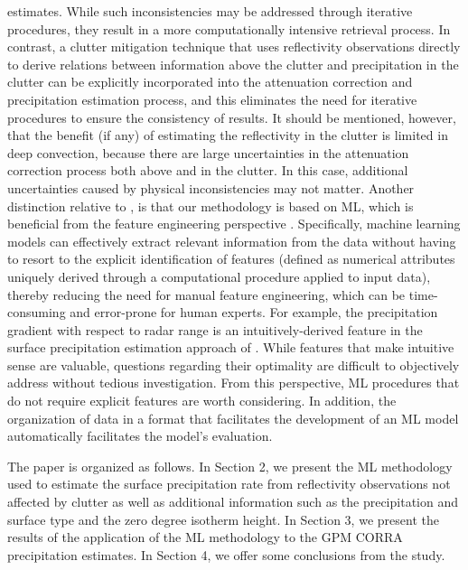 \documentclass{ametsocV6.1} %
\begin{document}
estimates. While such inconsistencies may be addressed through iterative procedures, they result in a more computationally intensive retrieval process. In contrast, a clutter mitigation technique that uses reflectivity observations directly to derive relations between information above the clutter and precipitation in the clutter can be explicitly incorporated into the attenuation correction and precipitation estimation process, and this eliminates the need for iterative procedures to ensure the consistency of results.  It should be mentioned, however, that the benefit (if any) of estimating the reflectivity in the clutter is limited in deep convection, because there are large uncertainties in the attenuation correction process both above and in the clutter.  In this case, additional uncertainties caused by physical inconsistencies may not matter. Another distinction relative to \cite{hirose2021}, is that our methodology is based on ML, which is beneficial from the feature engineering  perspective \citep{zheng2018}. Specifically, machine learning models can effectively extract relevant information from the data without having to resort to the explicit identification of features (defined as numerical attributes uniquely derived through a computational procedure applied to input data), thereby reducing the need for manual feature engineering, which can be time-consuming and error-prone for human experts. For example, the precipitation gradient with respect to radar range is an intuitively-derived feature in the surface precipitation estimation approach of \cite{hirose2021}. While features that make intuitive sense are valuable, questions regarding their optimality are difficult to objectively address without tedious investigation.  From this perspective, ML procedures that do not require explicit features are worth considering.  In addition, the organization of data in a format that facilitates the development of an ML model automatically facilitates the model's evaluation.
 
The paper is organized as follows.  In Section 2, we present the ML methodology used to estimate the surface precipitation rate from reflectivity observations not affected by clutter as well as additional information such as the precipitation and surface type and the zero degree isotherm height.  In Section 3, we present the results of the application of the ML methodology to the GPM CORRA precipitation estimates.  In Section 4, we offer some conclusions from the study.
\end{document}

